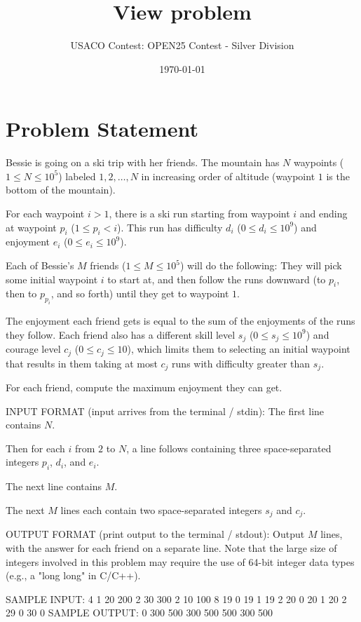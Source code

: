 \documentclass[12pt]{article}
\title{View problem}
\author{USACO Contest: OPEN25 Contest - Silver Division}
\date{\today}
\begin{document}
\maketitle

\section*{Problem Statement}


Bessie is going on a ski trip with her friends. The mountain has $N$ waypoints
($1\leq N \leq 10^5$) labeled $1, 2, \ldots, N$ in increasing order of altitude 
(waypoint $1$ is the bottom of the mountain). 

For each waypoint $i > 1$, there is a ski run starting from waypoint $i$ and
ending at waypoint $p_i$ ($1\le p_i<i$).  This run has difficulty $d_i$
($0 \leq d_i \leq 10^9$) and enjoyment $e_i$ ($0 \leq e_i \leq 10^9$).

Each of Bessie's $M$ friends ($1\leq M \leq 10^5$) will do the following: They
will pick some initial waypoint $i$ to start at, and then follow the runs
downward (to $p_i$, then to $p_{p_i}$, and so forth) until they get to waypoint
$1$. 

The enjoyment each friend gets is equal to the sum of the enjoyments of the runs
they follow. Each friend also has a different skill level $s_j$
($0 \leq s_j \leq 10^9$)  and courage level $c_j$ ($0 \leq c_j \leq 10$), which
limits them to selecting an initial waypoint that results in them taking  at
most $c_j$ runs with difficulty greater than $s_j$.

For each friend, compute the maximum enjoyment they can get.

INPUT FORMAT (input arrives from the terminal / stdin):
The first line contains $N$.

Then for each $i$ from $2$ to $N$, a line follows containing three
space-separated integers $p_i$, $d_i$, and $e_i$.

The next line contains $M$.

The next $M$ lines each contain two space-separated integers $s_j$ and $c_j$.

OUTPUT FORMAT (print output to the terminal / stdout):
    Output $M$ lines, with the answer for each friend on a separate line.
    Note that the large size of integers involved in this problem may require the
use of 64-bit integer data types (e.g., a "long long" in C/C++).

SAMPLE INPUT:
4
1 20 200
2 30 300
2 10 100
8
19 0
19 1
19 2
20 0
20 1
20 2
29 0
30 0
SAMPLE OUTPUT: 
0
300
500
300
500
500
300
500
\end{document}

